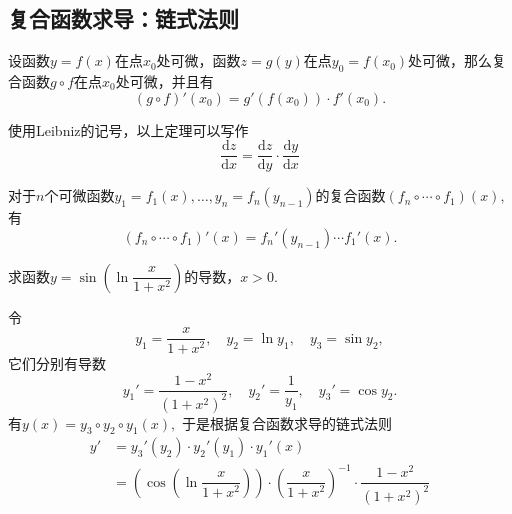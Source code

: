 
\subsection{复合函数求导：链式法则}


\begin{frame}

\begin{thm}
设函数$y=f(x)$在点$x_0$处可微，函数$z = g(y)$在点$y_0 = f(x_0)$处可微，那么复合函数$g\circ f$在点$x_0$处可微，并且有
\[(g\circ f)'(x_0) = g'(f(x_0))\cdot f'(x_0).\]
\end{thm}

\pause

使用Leibniz的记号，以上定理可以写作
\[\dfrac{\mathrm{d}z}{\mathrm{d}x} = \dfrac{\mathrm{d}z}{\mathrm{d}y} \cdot \dfrac{\mathrm{d}y}{\mathrm{d}x}\]

\pause

\begin{cor}
对于$n$个可微函数$y_1 = f_1(x), \ldots, y_n = f_n(y_{n-1})$的复合函数$(f_n\circ\cdots\circ f_1)(x),$ 有
\[(f_n \circ \cdots \circ f_1)'(x) = f_n'(y_{n-1}) \cdots f_1'(x).\]
\end{cor}

\end{frame}


\begin{frame}

\begin{eg}
\centering
求函数$y = \sin\left(\ln\dfrac{x}{1+x^2}\right)$的导数，$x > 0.$
\end{eg}

\pause

令
\[y_1 = \dfrac{x}{1+x^2},\quad  y_2 = \ln y_1,\quad  y_3 = \sin y_2,\]
它们分别有导数
\[y_1' = \dfrac{1-x^2}{(1+x^2)^2},\quad  y_2' = \dfrac{1}{y_1},\quad y_3' = \cos y_2.\]
有$y(x) = y_3 \circ y_2 \circ y_1(x),$ 于是根据复合函数求导的链式法则
\begin{align*}
y' & = y_3'(y_2)\cdot y_2'(y_1)\cdot y_1'(x) \\
& = \left(\cos\left(\ln\dfrac{x}{1+x^2}\right)\right) \cdot \left(\dfrac{x}{1+x^2}\right)^{-1} \cdot \dfrac{1-x^2}{(1+x^2)^2}
\end{align*}

\end{frame}

